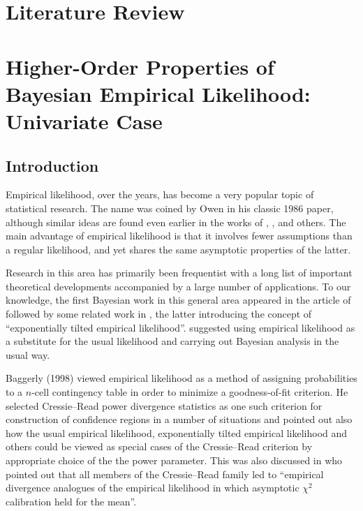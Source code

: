 \documentclass[oneside,english]{amsbook}
\numberwithin{section}{chapter}
\numberwithin{equation}{section}
\numberwithin{figure}{section}
\theoremstyle{plain}
\theoremstyle{plain}
\theoremstyle{definition}
\theoremstyle{plain}
\theoremstyle{plain}
\theoremstyle{remark}
\theoremstyle{definition}
\theoremstyle{definition}
\begin{document}
\chapter{Literature Review}



\chapter{Higher-Order Properties of Bayesian Empirical Likelihood: Univariate
Case}
\section{Introduction}

Empirical likelihood, over the years, has become a very popular topic
of statistical research. The name was coined by Owen in his classic
1986 paper, although similar ideas are found even earlier in the works
of \cite{hartley1968new}%
, \cite{thomas1975confidence}%
, \cite{rubin1981bayesian} and others. The main advantage of empirical
likelihood is that it involves fewer assumptions than a regular likelihood,
and yet shares the same asymptotic properties of the latter. 

Research in this area has primarily been frequentist with a long list
of important theoretical developments accompanied by a large number
of applications. To our knowledge, the first Bayesian work in this
general area appeared in the article of \cite{lazar2003bayesian}
{} followed by some related work in \cite{schennach2005bayesian,schennach2007point}
, the latter introducing the concept of ``exponentially tilted empirical
likelihood''. \cite{lazar2003bayesian} suggested using empirical
likelihood as a substitute for the usual likelihood and carrying out
Bayesian analysis in the usual way. 

Baggerly (1998) \cite{baggerly1998empirical} viewed empirical likelihood as a method
of assigning probabilities to a $n$-cell contingency table in order
to minimize a goodness-of-fit criterion. He selected Cressie--Read
power divergence statistics as one such criterion for construction
of confidence regions in a number of situations and pointed out also
how the usual empirical likelihood, exponentially tilted empirical
likelihood and others could be viewed as special cases of the Cressie--Read
criterion by appropriate choice of the the power parameter. This was
also discussed in \cite{owen2010empirical} who pointed out that
all members of the Cressie--Read family led to ``empirical divergence
analogues of the empirical likelihood in which asymptotic $\chi^{2}$
calibration held for the mean''.
\end{document}

